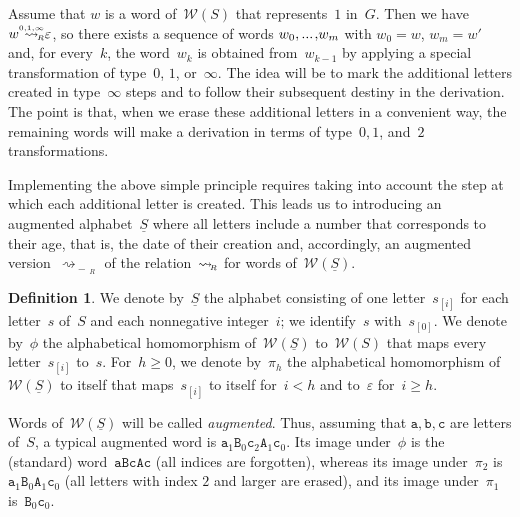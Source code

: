 \documentclass{amsart}
\numberwithin{equation}{section}
\theoremstyle{plain}
\theoremstyle{definition}
\newtheorem{defi}[prop]{Definition}
\let\ge=\geqslant
\begin{document}
Assume that ${w}$ is a word of~${\mathcal{W}({S})}$ that represents~$1$ in~${G}$. Then we have ${w} {\mathrel{{\mathrel{\overset{\scriptscriptstyle 0,1,\infty}{\rightsquigarrow}}}_{\hspace{-1.2ex}{\scriptscriptstyle R}}}} {\varepsilon}$, so there exists a sequence of words ${w}_0 {, ...\hspace{0.2ex},} {w}_{m}$ with ${w}_0 = {w}$, ${w}_{m} = {w}'$ and, for every~${k}$, the word~${w}_{k}$ is obtained from~${w}_{{k}-1}$ by applying a special transformation of type~$0$, $1$, or~$\infty$. The idea will be to mark the additional letters created in type~$\infty$ steps and to follow their subsequent destiny in the derivation. The point is that, when we erase these additional letters in a convenient way, the remaining words will make a derivation in terms of type~$0, 1$, and~$2$ transformations.

Implementing the above simple principle requires taking into account the step at which each additional letter is created. This leads us to introducing an augmented alphabet~${\underline{S}}$ where all letters include a number that corresponds to their age, that is, the date of their creation and, accordingly, an augmented version~${\mathrel{\overset{{}_{{}}}{\rightsquigarrow_{\!\!\!\!\!\!-\,{{\!{}_{R}}}}}}}$ of the relation~${\overset{{}_{{}}}{\rightsquigarrow}_{\hspace{-0.4ex}{\scriptscriptstyle R}}}$ for words of~${\mathcal{W}({\underline{S}})}$.

\begin{defi}
We denote by~${\underline{S}}$ the alphabet consisting of one letter~${{s}_{[{i}]}}$ for each letter~${s}$ of~${S}$ and each nonnegative integer~${i}$; we identify~${s}$ with~${{s}_{[0]}}$. We denote by~$\phi$ the alphabetical homomorphism of~${\mathcal{W}({\underline{S}})}$ to~$ {\mathcal{W}({S})}$ that maps every letter~${{s}_{[{i}]}}$ to~${s}$. For~${h} \ge 0$, we denote by~$\pi_{h}$ the alphabetical homomorphism of~${\mathcal{W}({\underline{S}})}$ to itself that maps~${{s}_{[{i}]}}$ to itself for~${i} < {h}$ and to~${\varepsilon}$ for~${i} \ge {h}$.
\end{defi}

Words of~${\mathcal{W}({\underline{S}})}$ will be called \emph{augmented}. Thus, assuming that ${\mathtt{a}}, {\mathtt{b}}, {\mathtt{c}}$ are letters of~${S}$, a typical augmented word is ${{\mathtt{a}}_{1}} {{\mathtt{B}}_{0}} {{\mathtt{c}}_{2}} {{\mathtt{A}}_{1}} {{\mathtt{c}}_{0}}$. Its image under~$\phi$ is the (standard) word~${\mathtt{a}} {\mathtt{B}} {\mathtt{c}} {\mathtt{A}} {\mathtt{c}}$ (all indices are forgotten), whereas its image under~$\pi_2$ is ${{\mathtt{a}}_{1}} {{\mathtt{B}}_{0}} {{\mathtt{A}}_{1}} {{\mathtt{c}}_{0}}$ (all letters with index $2$ and larger are erased), and its image under~$\pi_1$ is~${{\mathtt{B}}_{0}} {{\mathtt{c}}_{0}}$.
\end{document}
